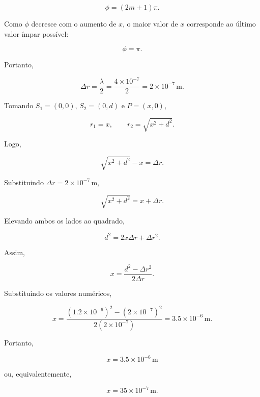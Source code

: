 \[
\phi=(2m+1)\pi.
\]

Como \(\phi\) decresce com o aumento de \(x\), o maior valor de \(x\)
corresponde ao último valor ímpar possível:

\[
\phi=\pi.
\]

Portanto,

\[
\Delta r=\frac{\lambda}{2}
=\frac{4\times10^{-7}}{2}
=2\times10^{-7}\,\text{m}.
\]

Tomando \(S_1=(0,0)\), \(S_2=(0,d)\) e \(P=(x,0)\),

\[
r_1=x,
\qquad
r_2=\sqrt{x^2+d^2}.
\]

Logo,

\[
\sqrt{x^2+d^2}-x=\Delta r.
\]

Substituindo \(\Delta r=2\times10^{-7}\,\text{m}\),

\[
\sqrt{x^2+d^2}=x+\Delta r.
\]

Elevando ambos os lados ao quadrado,

\[
d^2=2x\Delta r+\Delta r^2.
\]

Assim,

\[
x=\frac{d^2-\Delta r^2}{2\Delta r}.
\]

Substituindo os valores numéricos,

\[
x=
\frac{(1.2\times10^{-6})^2-(2\times10^{-7})^2}
     {2(2\times10^{-7})}
=
3.5\times10^{-6}\,\text{m}.
\]

Portanto,

\[
\boxed{x=3.5\times10^{-6}\,\text{m}}
\]

ou, equivalentemente,

\[
\boxed{x=35\times10^{-7}\,\text{m}}.
\]

\vspace{1cm}
